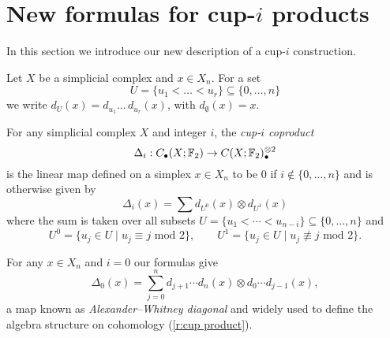 
\section{New formulas for cup-\texorpdfstring{$i$}{i} products} \label{s:formulas}


In this section we introduce our new description of a cup-$i$ construction.

\begin{notation}
	Let $X$ be a simplicial complex and $x \in X_n$.
	For a set
	\begin{equation*}
	U = \{u_1 < \dots < u_r\} \subseteq \{0, \dots, n\}
	\end{equation*}
	we write $d_U(x) = d_{u_1} \ldots\, d_{u_r}(x)$, with $d_{\emptyset}(x) = x$.
\end{notation}

\begin{definition} \label{d:cup-i coproducts}
	For any simplicial complex $X$ and integer $i$, the \textit{cup-$i$ coproduct}
	\begin{equation*}
	\Delta_i : C_\bullet(X; {\mathbb{F}_2}) \to C(X; {\mathbb{F}_2})^{\otimes 2}_\bullet
	\end{equation*}
	is the linear map defined on a simplex $x \in X_n$ to be $0$ if $i \not\in \{0, \dots, n\}$ and is otherwise given by
	\begin{equation} \label{e:new formulas}
	\Delta_i(x) = \sum d_{U^0}(x) \otimes d_{U^1}(x)
	\end{equation}
	where the sum is taken over all subsets $U = \{u_1 < \cdots < u_{n-i}\} \subseteq \{0, \dots, n\}$ and
	\begin{equation} \label{e:partition subsets}
	U^0 = \{u_j \in U\mid u_j \equiv j \text{ mod } 2\}, \qquad
	U^1 = \{u_j \in U\mid u_j \not\equiv j \text{ mod } 2\}.
	\end{equation}
\end{definition}

\begin{example} \label{ex:alexander-whitney diagonal}
	For any $x \in X_n$ and $i = 0$ our formulas give
	\begin{equation*}
	\Delta_0(x) = \sum_{j=0}^n d_{j+1} \cdots d_{n}(x) \otimes d_{0} \cdots d_{j-1}(x),
	\end{equation*}
	a map known as \textit{Alexander--Whitney diagonal} and widely used to define the algebra structure on cohomology (\cref{r:cup product}).
\end{example}

